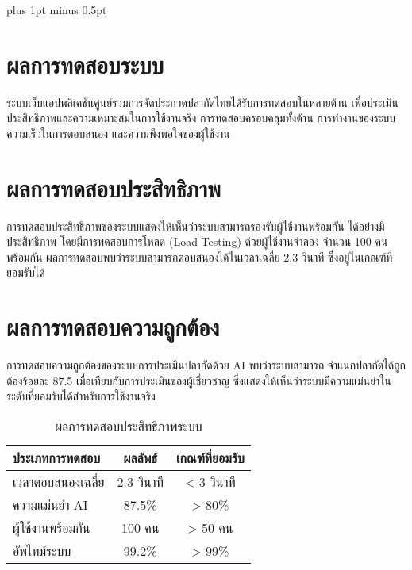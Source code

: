 
\clearpage
\thispagestyle{plain}

\begingroup
\fontsize{16pt}{19.2pt}\selectfont
\justifying
\XeTeXlinebreakskip=0pt plus 1pt minus 0.5pt
\setlength{\parindent}{1.5cm}
\setlength{\parskip}{0pt}

\section*{ผลการทดสอบระบบ}

\indent ระบบเว็บแอปพลิเคชันศูนย์รวมการจัดประกวดปลากัดไทยได้รับการทดสอบในหลายด้าน
เพื่อประเมินประสิทธิภาพและความเหมาะสมในการใช้งานจริง การทดสอบครอบคลุมทั้งด้าน
การทำงานของระบบ ความเร็วในการตอบสนอง และความพึงพอใจของผู้ใช้งาน

\section*{ผลการทดสอบประสิทธิภาพ}

\indent การทดสอบประสิทธิภาพของระบบแสดงให้เห็นว่าระบบสามารถรองรับผู้ใช้งานพร้อมกัน
ได้อย่างมีประสิทธิภาพ โดยมีการทดสอบการโหลด (Load Testing) ด้วยผู้ใช้งานจำลอง
จำนวน 100 คนพร้อมกัน ผลการทดสอบพบว่าระบบสามารถตอบสนองได้ในเวลาเฉลี่ย
2.3 วินาที ซึ่งอยู่ในเกณฑ์ที่ยอมรับได้

\section*{ผลการทดสอบความถูกต้อง}

\indent การทดสอบความถูกต้องของระบบการประเมินปลากัดด้วย AI พบว่าระบบสามารถ
จำแนกปลากัดได้ถูกต้องร้อยละ 87.5 เมื่อเทียบกับการประเมินของผู้เชี่ยวชาญ
ซึ่งแสดงให้เห็นว่าระบบมีความแม่นยำในระดับที่ยอมรับได้สำหรับการใช้งานจริง

\begin{table}[h]
\centering
\caption{ผลการทดสอบประสิทธิภาพระบบ}
\begin{tabular}{|l|c|c|}
\hline
\textbf{ประเภทการทดสอบ} & \textbf{ผลลัพธ์} & \textbf{เกณฑ์ที่ยอมรับ} \\
\hline
เวลาตอบสนองเฉลี่ย & 2.3 วินาที & < 3 วินาที \\
\hline
ความแม่นยำ AI & 87.5\% & > 80\% \\
\hline
ผู้ใช้งานพร้อมกัน & 100 คน & > 50 คน \\
\hline
อัพไทม์ระบบ & 99.2\% & > 99\% \\
\hline
\end{tabular}
\end{table}

